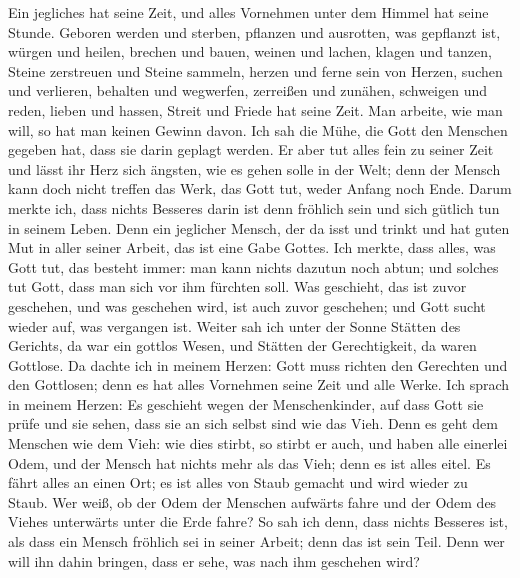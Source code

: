  Ein jegliches hat seine Zeit, und alles Vornehmen unter
dem Himmel hat seine Stunde.  Geboren werden und sterben,
pflanzen und ausrotten, was gepflanzt ist,  würgen und
heilen, brechen und bauen,  weinen und lachen, klagen und
tanzen,  Steine zerstreuen und Steine sammeln, herzen und
ferne sein von Herzen,  suchen und verlieren, behalten und
wegwerfen,  zerreißen und zunähen, schweigen und reden,
 lieben und hassen, Streit und Friede hat seine Zeit.
 Man arbeite, wie man will, so hat man keinen Gewinn
davon.  Ich sah die Mühe, die Gott den Menschen gegeben
hat, dass sie darin geplagt werden.  Er aber tut alles
fein zu seiner Zeit und lässt ihr Herz sich ängsten, wie es gehen solle
in der Welt; denn der Mensch kann doch nicht treffen das Werk, das Gott
tut, weder Anfang noch Ende.  Darum merkte ich, dass
nichts Besseres darin ist denn fröhlich sein und sich gütlich tun in
seinem Leben.  Denn ein jeglicher Mensch, der da isst und
trinkt und hat guten Mut in aller seiner Arbeit, das ist eine Gabe
Gottes.  Ich merkte, dass alles, was Gott tut, das
besteht immer: man kann nichts dazutun noch abtun; und solches tut Gott,
dass man sich vor ihm fürchten soll.  Was geschieht, das
ist zuvor geschehen, und was geschehen wird, ist auch zuvor geschehen;
und Gott sucht wieder auf, was vergangen ist.  Weiter sah
ich unter der Sonne Stätten des Gerichts, da war ein gottlos Wesen, und
Stätten der Gerechtigkeit, da waren Gottlose.  Da dachte
ich in meinem Herzen: Gott muss richten den Gerechten und den Gottlosen;
denn es hat alles Vornehmen seine Zeit und alle Werke. 
Ich sprach in meinem Herzen: Es geschieht wegen der Menschenkinder, auf
dass Gott sie prüfe und sie sehen, dass sie an sich selbst sind wie das
Vieh.  Denn es geht dem Menschen wie dem Vieh: wie dies
stirbt, so stirbt er auch, und haben alle einerlei Odem, und der Mensch
hat nichts mehr als das Vieh; denn es ist alles eitel. 
Es fährt alles an einen Ort; es ist alles von Staub gemacht und wird
wieder zu Staub.  Wer weiß, ob der Odem der Menschen
aufwärts fahre und der Odem des Viehes unterwärts unter die Erde fahre?
 So sah ich denn, dass nichts Besseres ist, als dass ein
Mensch fröhlich sei in seiner Arbeit; denn das ist sein Teil. Denn wer
will ihn dahin bringen, dass er sehe, was nach ihm geschehen wird?

